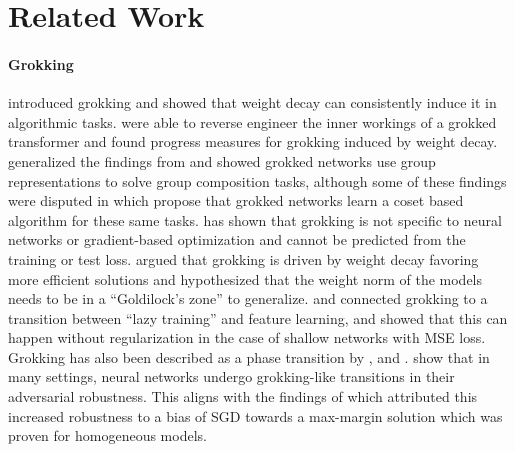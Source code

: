 \section{Related Work}
\paragraph{Grokking}
\cite{power2022grokking} introduced grokking and showed that weight decay can consistently induce it in algorithmic tasks. \cite{Nanda2023-hf} were able to reverse engineer the inner workings of a grokked transformer and found progress measures for grokking induced by weight decay. \cite{chughtai2023toy} generalized the findings from \cite{Nanda2023-hf} and showed grokked networks use group representations to solve group composition tasks, although some of these findings were disputed in \cite{stander2023grokking} which propose that grokked networks learn a coset based algorithm for these same tasks. \citet{mallinar2024emergence} has shown that grokking is not specific to neural networks or gradient-based optimization and cannot be predicted from the training or test loss. \cite{Varma2023} argued that grokking is driven by weight decay favoring more efficient solutions and \cite{liu2023grokking} hypothesized that the weight norm of the models needs to be in a ``Goldilock's zone'' to generalize. \cite{Kumar2023-hz} and \cite{Lyu2023-ga} connected grokking to a transition between ``lazy training'' \citep{Chizat_Oyallon_Bach_2018} and feature learning, and \cite{Kumar2023-hz} showed that this can happen without regularization in the case of shallow networks with MSE loss. Grokking has also been described as a phase transition by \cite{vzunkovivc2024grokking}, \cite{Lyu2023-ga} and \cite{rubin2024grokking}. \cite{humayun2024deep} show that in many settings, neural networks undergo grokking-like transitions in their adversarial robustness. This aligns with the findings of \cite{Lyu2019-sc} which attributed this increased robustness to a bias of SGD towards a max-margin solution which was proven for homogeneous models.

